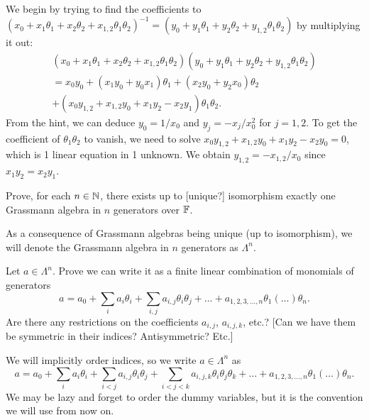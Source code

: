 \begin{answer}
  We begin by trying to find the coefficients to
  $(x_{0} + x_{1}\theta_{1} + x_{2}\theta_{2} + x_{1,2}\theta_{1}\theta_{2})^{-1}=(y_{0}+y_{1}\theta_{1}+y_{2}\theta_{2}+y_{1,2}\theta_{1}\theta_{2})$
  by multiplying it out:
\begin{multline}
(x_{0} + x_{1}\theta_{1} + x_{2}\theta_{2} + x_{1,2}\theta_{1}\theta_{2})(y_{0}+y_{1}\theta_{1}+y_{2}\theta_{2}+y_{1,2}\theta_{1}\theta_{2})\\
    = x_{0}y_{0} + (x_{1}y_{0} + y_{0}x_{1})\theta_{1}
    + (x_{2}y_{0} + y_{2}x_{0})\theta_{2}\\
    + (x_{0}y_{1,2} + x_{1,2}y_{0} + x_{1}y_{2} - x_{2}y_{1})\theta_{1}\theta_{2}.
\end{multline}
From the hint, we can deduce $y_{0}=1/x_{0}$ and $y_{j}=-x_{j}/x_{0}^{2}$
for $j=1,2$. To get the coefficient of $\theta_{1}\theta_{2}$ to vanish,
we need to solve $x_{0}y_{1,2}+x_{1,2}y_{0}+x_{1}y_{2}-x_{2}y_{0}=0$,
which is 1 linear equation in 1 unknown. We obtain
$y_{1,2} = -x_{1,2}/x_{0}$ since $x_{1}y_{2}=x_{2}y_{1}$.
\end{answer}

\begin{exercise}
Prove, for each $n\in\mathbb{N}$, there exists up to [unique?] isomorphism
exactly one Grassmann algebra in $n$ generators over $\mathbb{F}$.
\end{exercise}

 As a consequence of Grassmann algebras being unique (up to
isomorphism), we will denote the Grassmann algebra in $n$ generators as $\Lambda^{n}$.

\begin{exercise}
Let $a\in\Lambda^{n}$. Prove we can write it as a finite linear
combination of monomials of generators
\begin{equation}
a = a_{0} + \sum_{i}a_{i}\theta_{i} +
\sum_{i,j}a_{i,j}\theta_{i}\theta_{j} + \dots + a_{1,2,3,\dots,n}\theta_{1}(\dots)\theta_{n}.
\end{equation}
Are there any restrictions on the coefficients $a_{i,j}$, $a_{i,j,k}$,
etc.? [Can we have them be symmetric in their indices? Antisymmetric? Etc.]
\end{exercise}

We will implicitly order indices, so we write $a\in\Lambda^{n}$ as
\begin{equation}
a = a_{0} + \sum_{i}a_{i}\theta_{i} +
\sum_{i<j}a_{i,j}\theta_{i}\theta_{j} +
\sum_{i<j<k}a_{i,j,k}\theta_{i}\theta_{j}\theta_{k} +
\dots + a_{1,2,3,\dots,n}\theta_{1}(\dots)\theta_{n}.
\end{equation}
We may be lazy and forget to order the dummy variables, but it is the
convention we will use from now on.

